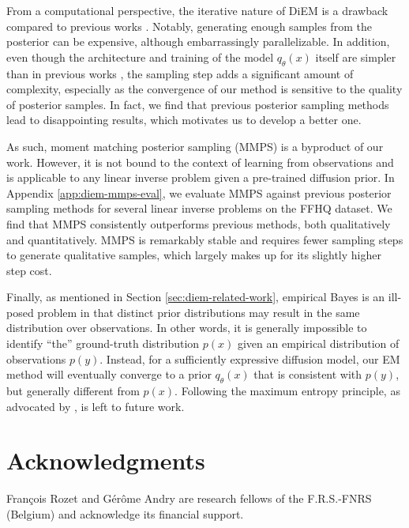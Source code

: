 From a computational perspective, the iterative nature of DiEM is a drawback compared to previous works \cite{daras2023ambient, kawar2024gsurebased}. Notably, generating enough samples from the posterior can be expensive, although embarrassingly parallelizable. In addition, even though the architecture and training of the model $q_\theta(x)$ itself are simpler than in previous works \cite{daras2023ambient, kawar2024gsurebased}, the sampling step adds a significant amount of complexity, especially as the convergence of our method is sensitive to the quality of posterior samples. In fact, we find that previous posterior sampling methods \cite{chung2023diffusion, song2023pseudoinverseguided, rozet2023scorebased, boys2023tweedie, zhu2023denoising} lead to disappointing results, which motivates us to develop a better one.

As such, moment matching posterior sampling (MMPS) is a byproduct of our work. However, it is not bound to the context of learning from observations and is applicable to any linear inverse problem given a pre-trained diffusion prior. In Appendix \ref{app:diem-mmps-eval}, we evaluate MMPS against previous posterior sampling methods for several linear inverse problems on the FFHQ \cite{karras2019stylebased} dataset. We find that MMPS consistently outperforms previous methods, both qualitatively and quantitatively. MMPS is remarkably stable and requires fewer sampling steps to generate qualitative samples, which largely makes up for its slightly higher step cost.

Finally, as mentioned in Section \ref{sec:diem-related-work}, empirical Bayes is an ill-posed problem in that distinct prior distributions may result in the same distribution over observations. In other words, it is generally impossible to identify \enquote{the} ground-truth distribution $p(x)$ given an empirical distribution of observations $p(y)$. Instead, for a sufficiently expressive diffusion model, our EM method will eventually converge to a prior $q_\theta(x)$ that is consistent with $p(y)$, but generally different from $p(x)$. Following the maximum entropy principle, as advocated by \textcite{vetter2024sourcerer}, is left to future work.

\section*{Acknowledgments}

François Rozet and Gérôme Andry are research fellows of the F.R.S.-FNRS (Belgium) and acknowledge its financial support.

